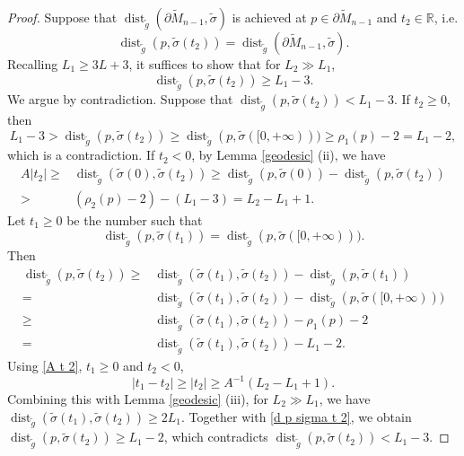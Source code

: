 \documentclass[11pt,letterpaper]{amsart}
\numberwithin{equation}{section}
\theoremstyle{definition}
\DeclareMathOperator{\dist}{dist}
\newcommand{\ti}[1]{\tilde{#1}}
\begin{document}
\begin{proof}
Suppose that $\dist_{\ti{g}}(\partial\ti{M}_{n-1},\ti{\sigma})$ is achieved at $p\in\partial\ti{M}_{n-1}$ and $t_{2}\in\mathbb{R}$, i.e.
\[
\dist_{\ti{g}}(p,\ti{\sigma}(t_{2})) = \dist_{\ti{g}}(\partial\ti{M}_{n-1},\ti{\sigma}).
\]
Recalling $L_{1}\geq 3L+3$, it suffices to show that for $L_{2}\gg L_{1}$,
\[
\dist_{\ti{g}}(p,\ti{\sigma}(t_{2}))\geq L_{1}-3.
\]
We argue by contradiction. Suppose that $\dist_{\ti{g}}(p,\ti{\sigma}(t_{2}))<L_{1}-3$. If $t_{2}\geq0$, then
\[
L_{1}-3 > \dist_{\ti{g}}(p,\ti{\sigma}(t_{2}))
\geq \dist_{\ti{g}}(p,\ti{\sigma}([0,+\infty)))
\geq \rho_{1}(p)-2 = L_{1}-2,
\]
which is a contradiction. If $t_{2}<0$, by Lemma \ref{geodesic} (ii), we have
\begin{equation}\label{A t 2}
\begin{split}
A|t_{2}| \geq {} & \dist_{\ti{g}}(\ti{\sigma}(0),\ti{\sigma}(t_{2}))
\geq \dist_{\ti{g}}(p,\ti{\sigma}(0))-\dist_{\ti{g}}(p,\ti{\sigma}(t_{2})) \\
> {} & (\rho_{2}(p)-2)-(L_{1}-3) = L_{2}-L_{1}+1.
\end{split}
\end{equation}
Let $t_{1}\geq0$ be the number such that
\[
\dist_{\ti{g}}(p,\ti{\sigma}(t_{1})) = \dist_{\ti{g}}(p,\ti{\sigma}([0,+\infty))).
\]
Then
\begin{equation}\label{d p sigma t 2}
\begin{split}
\dist_{\ti{g}}(p,\ti{\sigma}(t_{2}))
\geq {} & \dist_{\ti{g}}(\ti{\sigma}(t_{1}),\ti{\sigma}(t_{2}))-\dist_{\ti{g}}(p,\ti{\sigma}(t_{1})) \\
= {} & \dist_{\ti{g}}(\ti{\sigma}(t_{1}),\ti{\sigma}(t_{2}))-\dist_{\ti{g}}(p,\ti{\sigma}([0,+\infty))) \\
\geq {} & \dist_{\ti{g}}(\ti{\sigma}(t_{1}),\ti{\sigma}(t_{2}))-\rho_{1}(p)-2 \\
= {} & \dist_{\ti{g}}(\ti{\sigma}(t_{1}),\ti{\sigma}(t_{2}))-L_{1}-2.
\end{split}
\end{equation}
Using \eqref{A t 2}, $t_{1}\geq0$ and $t_{2}<0$,
\[
|t_{1}-t_{2}| \geq |t_{2}| \geq A^{-1}(L_{2}-L_{1}+1).
\]
Combining this with Lemma \ref{geodesic} (iii), for $L_{2}\gg L_{1}$, we have $\dist_{\ti{g}}(\ti{\sigma}(t_{1}),\ti{\sigma}(t_{2}))\geq 2L_{1}$. Together with \eqref{d p sigma t 2}, we obtain $\dist_{\ti{g}}(p,\ti{\sigma}(t_{2}))\geq L_{1}-2$, which contradicts $\dist_{\ti{g}}(p,\ti{\sigma}(t_{2}))<L_{1}-3$.
\end{proof}
\end{document}
